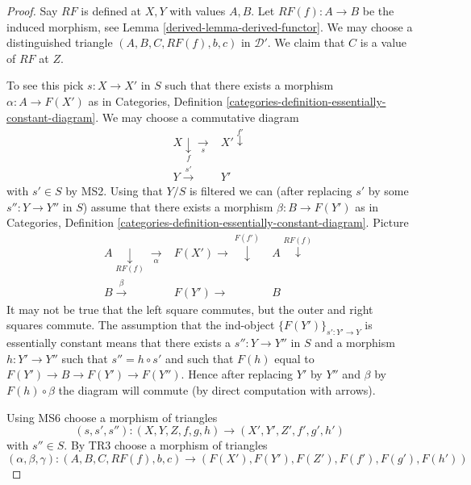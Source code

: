 \begin{proof}

Say $RF$ is defined at $X, Y$ with values $A, B$.
Let $RF(f) : A \to B$ be the induced morphism, see
Lemma \ref{derived-lemma-derived-functor}.
We may choose a distinguished triangle
$(A, B, C, RF(f), b, c)$
in $\mathcal{D}'$. We claim that $C$ is a value of $RF$ at $Z$.

\medskip\noindent
To see this pick $s : X \to X'$ in $S$ such that there exists a morphism
$\alpha : A \to F(X')$ as in
Categories,
Definition \ref{categories-definition-essentially-constant-diagram}.
We may choose a commutative diagram
$$
\begin{array}{cc}X \underset{f}{\downarrow}\underset{s}{\longrightarrow} & X' \overset{f'}{\downarrow} \\ Y \overset{s'}{\longrightarrow} & Y'\end{array}
$$
with $s' \in S$ by MS2. Using that $Y/S$ is filtered we can (after replacing
$s'$ by some $s'' : Y \to Y''$ in $S$) assume that there exists
a morphism $\beta : B \to F(Y')$ as in
Categories,
Definition \ref{categories-definition-essentially-constant-diagram}.
Picture
$$
\begin{array}{ccc}A \underset{RF(f)}{\downarrow}\underset{\alpha}{\longrightarrow} & F(X') \longrightarrow\overset{F(f')}{\downarrow} & A \overset{RF(f)}{\downarrow} \\ B \overset{\beta}{\longrightarrow} & F(Y') \longrightarrow & B\end{array}
$$
It may not be true that the left square commutes, but the outer and
right squares commute.
The assumption that the ind-object $\{F(Y')\}_{s' : Y' \to Y}$
is essentially constant means that there exists a $s'' : Y \to Y''$
in $S$ and a morphism $h : Y' \to Y''$ such that $s'' = h \circ s'$ and
such that $F(h)$ equal to $F(Y') \to B \to F(Y') \to F(Y'')$. Hence
after replacing $Y'$ by $Y''$ and $\beta$ by $F(h) \circ \beta$ the
diagram will commute (by direct computation with arrows).

\medskip\noindent
Using MS6 choose a morphism of triangles
$$
(s, s', s'') : (X, Y, Z, f, g, h) \longrightarrow (X', Y', Z', f', g', h')
$$
with $s'' \in S$. By TR3 choose a morphism of triangles
$$
(\alpha, \beta, \gamma) :
(A, B, C, RF(f), b, c)
\longrightarrow
(F(X'), F(Y'), F(Z'), F(f'), F(g'), F(h'))
$$


\end{proof}
